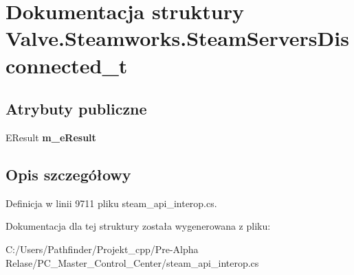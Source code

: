 \hypertarget{struct_valve_1_1_steamworks_1_1_steam_servers_disconnected__t}{}\section{Dokumentacja struktury Valve.\+Steamworks.\+Steam\+Servers\+Disconnected\+\_\+t}
\label{struct_valve_1_1_steamworks_1_1_steam_servers_disconnected__t}
\subsection*{Atrybuty publiczne}
\begin{DoxyCompactItemize}
\item 
\mbox{\label{struct_valve_1_1_steamworks_1_1_steam_servers_disconnected__t_ab2b1b3b3bf66f3ead83dfd6962c1216e}} 
E\+Result {\bfseries m\+\_\+e\+Result}
\end{DoxyCompactItemize}


\subsection{Opis szczegółowy}


Definicja w linii 9711 pliku steam\+\_\+api\+\_\+interop.\+cs.



Dokumentacja dla tej struktury została wygenerowana z pliku\+:\begin{DoxyCompactItemize}
\item 
C\+:/\+Users/\+Pathfinder/\+Projekt\+\_\+cpp/\+Pre-\/\+Alpha Relase/\+P\+C\+\_\+\+Master\+\_\+\+Control\+\_\+\+Center/steam\+\_\+api\+\_\+interop.\+cs\end{DoxyCompactItemize}
